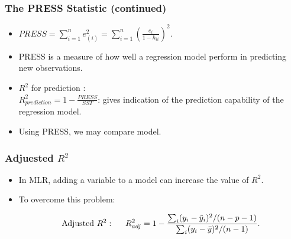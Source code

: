 \documentclass[10pt]{beamer} %
\begin{document}
\begin{frame}
   \frametitle{The PRESS Statistic (continued)}
   \begin{itemize}
      \item $PRESS=\sum_{i=1}^n e_{(i)}^2=\sum_{i=1}^n \left(\frac{e_i}{1-h_{ii}}\right)^2$.
         \vspace{0.45cm}
      \item PRESS is a measure of how well a regression model perform in predicting new observations.
         \vspace{0.45cm}
      \item $R^2$ for prediction : \\[0.25cm] $R_{prediction}^2=1-\frac{PRESS}{SST}$: gives indication of the prediction capability of the regression model.
         \vspace{0.45cm}
      \item Using PRESS, we may compare model.
   \end{itemize}    
\end{frame}

\begin{frame}
   \frametitle{Adjuested $R^2$}
   \begin{itemize}
      \item In MLR, adding a variable to a model can increase the value of $R^{2}$.
         \smallskip
      \item To overcome this problem:

         \[ 
            \mbox{Adjusted } R^{2}: \hspace{0.5cm}  R^{2}_{adj}  = 1 -
            \frac{\sum_{i}(y_{i} - \hat y_{i})^{2}/(n-p-1)}{\sum_{i}(y_{i} -
            \bar y)^{2}/(n-1)}.
         \]
   \end{itemize}  
\end{frame}
\end{document}
